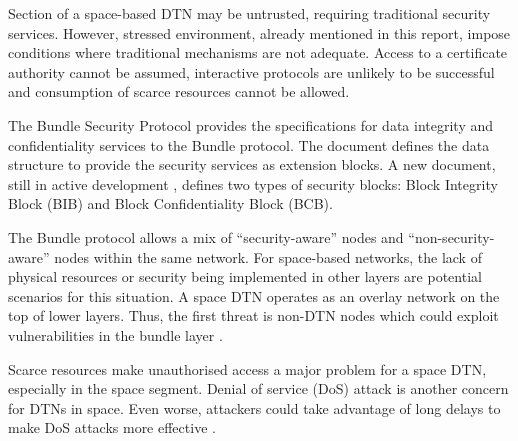 

 
Section of a space-based DTN may be untrusted, requiring traditional security services. However, stressed environment, already mentioned in this report, impose conditions where traditional mechanisms are not adequate. Access to a certificate authority cannot be assumed, interactive protocols are unlikely to be successful and consumption of scarce resources cannot be allowed. 
 
 The Bundle Security Protocol \cite{rfc6257} provides the specifications for data integrity and confidentiality services to the Bundle protocol. The document defines the data structure to provide the security services as extension blocks. A new document, still in active development \cite{ietf-dtn-bpsec-07}, defines two types of security blocks: Block Integrity Block (BIB) and Block Confidentiality Block (BCB).  
 
 
 
 The Bundle protocol allows a mix of ``security-aware'' nodes and ``non-security-aware'' nodes within the same network. For space-based networks, the lack of physical resources or security being implemented in other layers are potential scenarios for this situation. A space DTN operates as an overlay network on the top of lower layers. Thus, the first threat is non-DTN nodes which could exploit vulnerabilities in the bundle layer \cite{rfc6257}.
 
Scarce resources make unauthorised access a major problem for a space DTN, especially in the space segment. Denial of service (DoS) attack is another concern for DTNs in space. Even worse, attackers could take advantage of long delays to make DoS attacks more effective \cite{rfc6257}. 

 

